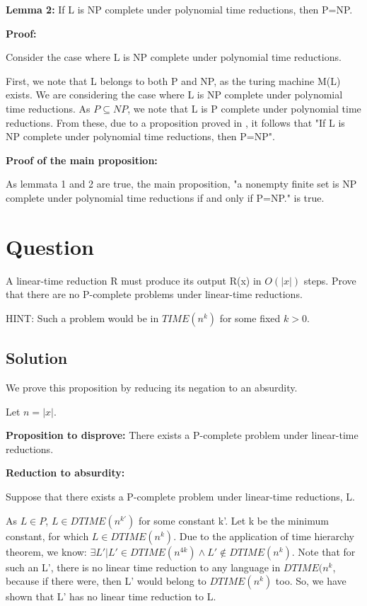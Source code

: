 \documentclass[10pt]{article}
\begin{document}
\textbf{Lemma 2:} If L is NP complete under polynomial time reductions, then P=NP.

\textbf{Proof:}

Consider the case where L is NP complete under polynomial time reductions.

First, we note that L belongs to both P and NP, as the turing machine M(L) exists. We are considering the case where L is NP complete under polynomial time reductions. As $P \subseteq NP$, we note that L is P complete under polynomial time reductions. From these, due to a proposition proved in \cite{papadimitriouCC}, it follows that "If L is NP complete under polynomial time reductions, then P=NP".

\textbf{Proof of the main proposition:}

As lemmata 1 and 2 are true, the main proposition, "a nonempty finite set is NP complete under polynomial time reductions if and only if P=NP." is true.


\section{Question}
A linear-time reduction R must produce its output R(x) in $O(|x|)$ steps. Prove that there are no P-complete problems under linear-time reductions.

HINT: Such a problem would be in $TIME(n^{k})$ for some fixed $k > 0$.

\subsection{Solution}

We prove this proposition by reducing its negation to an absurdity.

Let $n=|x|$.

\textbf{Proposition to disprove:} There exists a P-complete problem under linear-time reductions.

\textbf{Reduction to absurdity:}

Suppose that there exists a P-complete problem under linear-time reductions, L.

As $L \in P$, $L \in DTIME(n^{k'})$ for some constant k'. Let k be the minimum constant, for which $L \in DTIME(n^{k})$. Due to the application of time hierarchy theorem, we know: $\exists L' | L' \in DTIME(n^{4k}) \wedge L' \notin DTIME(n^{k})$. Note that for such an L', there is no linear time reduction to any language in $DTIME(n^{k}$, because if there were, then L' would belong to $DTIME(n^{k})$ too. So, we have shown that L' has no linear time reduction to L.
\end{document}
